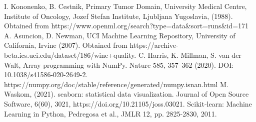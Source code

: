 \documentclass[titlepage]{article}
\begin{document}
\begin{thebibliography}{9}
		 I. Kononenko, B. Cestnik,  Primary Tumor Domain, University Medical Centre, Institute of Oncology, Jozef Stefan Institute, Ljubljana Yugoslavia, (1988). Obtained from https://www.openml.org/search?type=data\&sort=runs\&id=171
		 A. Asuncion, D. Newman, UCI Machine Learning Repository, University of California, Irvine  (2007).  Obtained from https://archive-beta.ics.uci.edu/dataset/186/wine+quality. 
		 C. Harris, K. Millman, S. van der Walt,  Array programming with NumPy. Nature 585, 357–362 (2020). DOI: 10.1038/s41586-020-2649-2.  https://numpy.org/doc/stable/reference/generated/numpy.isnan.html
		 M. Waskom, (2021). seaborn: statistical data visualization. Journal of Open Source Software, 6(60), 3021, https://doi.org/10.21105/joss.03021.
		Scikit-learn: Machine Learning in Python, Pedregosa et al., JMLR 12, pp. 2825-2830, 2011. 
\end{thebibliography}
\end{document}
